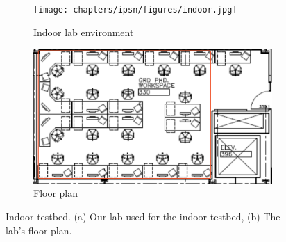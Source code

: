 \begin{figure}
	\centering
	\begin{subfigure}[t]{0.45\textwidth}
		\texttt{[image: chapters/ipsn/figures/indoor.jpg]}
		\caption{Indoor lab environment}
	\end{subfigure}
	\qquad
	\hspace{-0.15in}
	\begin{subfigure}[t]{0,42\textwidth}
		\includegraphics[width=\textwidth]{chapters/ipsn/figures/floor-plan.png}
		\caption{Floor plan}
	\end{subfigure}
	\caption{Indoor testbed. (a) Our lab used for the indoor testbed, (b) The lab's floor plan.}
	\label{fig:indoor}
\end{figure}


